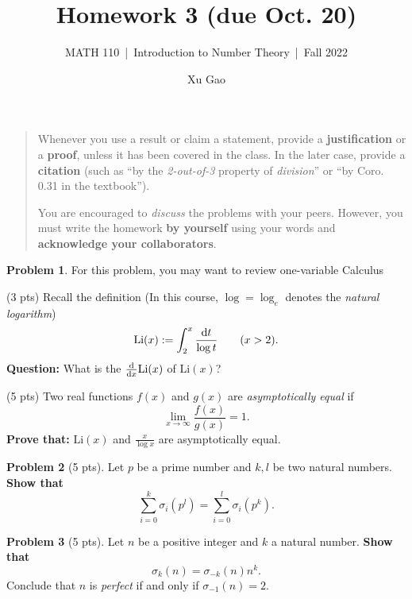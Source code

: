 \documentclass[11pt]{article}
\title{Homework 3 (due Oct. 20)}
\author{Xu Gao}
\subtitle{MATH 110~|~Introduction to Number Theory~|~Fall 2022}
\date{}
\theoremstyle{plain}
\theoremstyle{definition}
\newtheorem{problem}{Problem}
\theoremstyle{remark}
\numberwithin{equation}{problem}
\begin{document}
\maketitle

\begin{quotation}
	Whenever you use a result or claim a statement, provide a \textbf{justification} or a \textbf{proof}, unless it has been covered in the class. In the later case, provide a \textbf{citation} (such as ``by the \emph{2-out-of-3} property of \emph{division}'' or ``by Coro. 0.31 in the textbook'').

	You are encouraged to \emph{discuss} the problems with your peers. However, you must write the homework \textbf{by yourself} using your words and \textbf{acknowledge your collaborators}.
\end{quotation}

\begin{problem}
	For this problem, you may want to review one-variable Calculus
	\begin{listinprob}
		\item (3 pts) Recall the definition (In this course, $\log=\log_{e}$ denotes the \emph{natural logarithm})
									\[
										\mathrm{Li}(x):=
											\int_{2}^{x}\frac{\odif{t}}{\log{t}}
										\qquad (x>2).
									\]
									\textbf{Question:} What is the  $\odv*{}{x}\mathrm{Li}(x)$ of $\mathrm{Li}(x)$?
		\item (5 pts) Two real functions $f(x)$ and $g(x)$ are \emph{asymptotically equal} if 
		\[
			\lim_{x\to\infty} \frac{f(x)}{g(x)} = 1.
		\]
		\textbf{Prove that:} $\mathrm{Li}(x)$ and $\frac{x}{\log{x}}$ are asymptotically equal.
	\end{listinprob}
\end{problem}

\begin{problem}[5 pts]
	Let $p$ be a prime number and $k,l$ be two natural numbers. 
	\textbf{Show that} 
	\[
		\sum_{i=0}^{k}\sigma_{i}(p^l) = \sum_{i=0}^{l}\sigma_{i}(p^k).
	\]
\end{problem}

\begin{problem}[5 pts]
	Let $n$ be a positive integer and $k$ a natural number. 
	\textbf{Show that} 
	\[
		\sigma_k(n) = \sigma_{-k}(n)n^k.
	\]
	Conclude that $n$ is \emph{perfect} if and only if $\sigma_{-1}(n) = 2$.
\end{problem}
\end{document}
